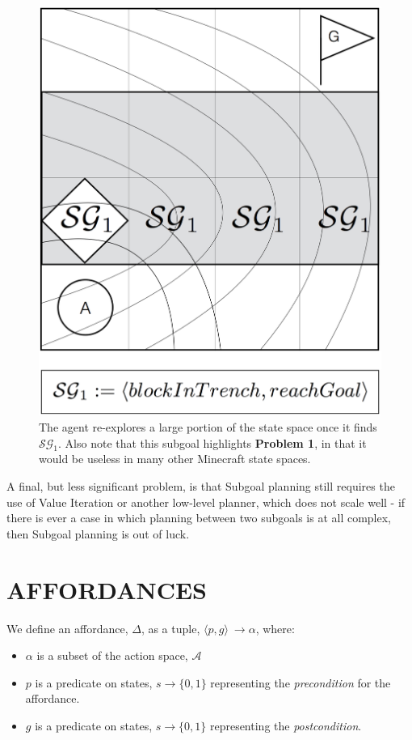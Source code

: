 \documentclass[]{article}
\begin{document}
\begin{figure}
\centering
\includegraphics[scale=0.22]{figures/bridgeworld_sg.png}
\caption{The agent re-explores a large portion of the state space 
once it finds $\mathcal{SG}_1$. Also note that this subgoal 
highlights {\bf Problem 1}, in that it would be useless in many other Minecraft state spaces.}
\label{fig:bwsg}
\end{figure}


A final, but less significant problem, is that Subgoal planning still 
requires the use of Value Iteration or another low-level planner, which does not scale well - if 
there is ever a case in which planning between two subgoals is 
at all complex, then Subgoal planning is out of luck.





\section{AFFORDANCES}
\label{sec:affordances}

We define an affordance, $\Delta$, as a tuple, $\langle
p,g\rangle\ \longrightarrow \alpha$, where:
\begin{itemize}
\item[] $\alpha$ is a subset of the action space, $\mathcal{A}$
\item[] $p$ is a predicate on states, $s \longrightarrow \{$0$, 1\}$
  representing the {\em precondition} for the affordance.
\item[] $g$ is a predicate on states, $s \longrightarrow \{$0$,1\}$
  representing the {\em postcondition}.
\end{itemize}
\end{document}
